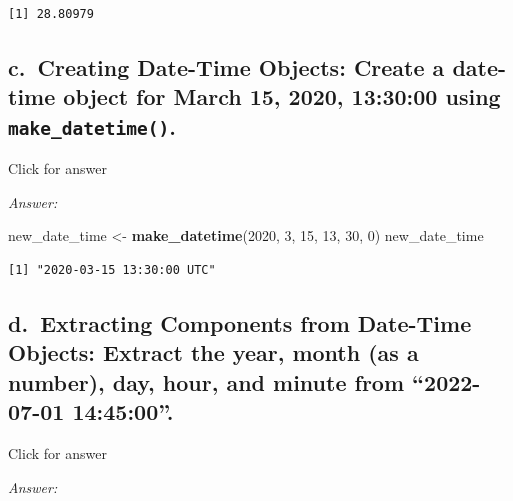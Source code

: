 \documentclass[
]{book}
\newenvironment{Shaded}{\begin{snugshade}}{\end{snugshade}}
\newcommand{\DecValTok}[1]{\textcolor[rgb]{0.00,0.00,0.81}{#1}}
\newcommand{\FunctionTok}[1]{\textcolor[rgb]{0.13,0.29,0.53}{\textbf{#1}}}
\newcommand{\NormalTok}[1]{#1}
\newcommand{\OtherTok}[1]{\textcolor[rgb]{0.56,0.35,0.01}{#1}}
\begin{document}
\begin{verbatim}
[1] 28.80979
\end{verbatim}

\hypertarget{c.-creating-date-time-objects-create-a-date-time-object-for-march-15-2020-133000-using-make_datetime.}{%
\subsection{\texorpdfstring{c.~Creating Date-Time Objects: Create a date-time object for March 15, 2020, 13:30:00 using \texttt{make\_datetime()}.}{c.~Creating Date-Time Objects: Create a date-time object for March 15, 2020, 13:30:00 using make\_datetime().}}\label{c.-creating-date-time-objects-create-a-date-time-object-for-march-15-2020-133000-using-make_datetime.}}

Click for answer

\emph{Answer:}

\begin{Shaded}
\begin{Highlighting}[]
\NormalTok{new\_date\_time }\OtherTok{\textless{}{-}} \FunctionTok{make\_datetime}\NormalTok{(}\DecValTok{2020}\NormalTok{, }\DecValTok{3}\NormalTok{, }\DecValTok{15}\NormalTok{, }\DecValTok{13}\NormalTok{, }\DecValTok{30}\NormalTok{, }\DecValTok{0}\NormalTok{)}
\NormalTok{new\_date\_time}
\end{Highlighting}
\end{Shaded}

\begin{verbatim}
[1] "2020-03-15 13:30:00 UTC"
\end{verbatim}

\hypertarget{d.-extracting-components-from-date-time-objects-extract-the-year-month-as-a-number-day-hour-and-minute-from-2022-07-01-144500.}{%
\subsection{d.~Extracting Components from Date-Time Objects: Extract the year, month (as a number), day, hour, and minute from ``2022-07-01 14:45:00''.}\label{d.-extracting-components-from-date-time-objects-extract-the-year-month-as-a-number-day-hour-and-minute-from-2022-07-01-144500.}}

Click for answer

\emph{Answer:}
\end{document}
